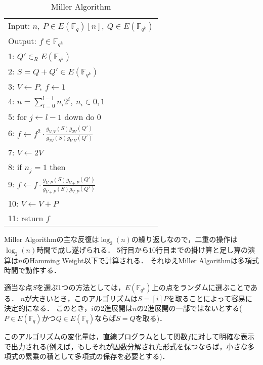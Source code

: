 \begin{table}[htbp]
 \begin{center}
  \begin{tabular}{|l|}
     \hline
     Input: $n, \ P \in E(\mathbb{F}_q)[n], \ Q \in E(\mathbb{F}_{q^k})$ \\
     Output: $f \in \mathbb{F}_{q^k}$  \\
     \hline
     1: \quad $Q' \in _R E(\mathbb{F}_{q^k})$\\
     2: \quad $S=Q+Q' \in E(\mathbb{F}_{q^k})$\\
     3: \quad $V \gets P, \ f \gets 1$\\
     4: \quad $n=\sum^{l-1}_{i=0} n_i 2^i, \ n_i \in {0,1}$\\
     5: \quad for $j \gets l-1$ down do 0\\
     6: \quad \quad $f \gets f^2 \cdot \frac{g_{V,V}(S)g_{2V}(Q')}{g_{2V}(S)g_{V,V}(Q')}$\\
     7: \quad \quad $V \gets 2V$\\
     8: \quad if $n_j = 1$ then\\
     9: \quad \quad $f \gets f \cdot \frac{g_{V,P}(S)g_{V+P}(Q')}{g_{V+P}(S)g_{V,P}(Q')}$\\
     10: \quad \quad $V \gets V+P$\\
     11: \quad return $f$\\
     \hline
   \end{tabular}
 \end{center}
 \caption{Miller Algorithm}
\end{table}
\par
Miller Algorithmの主な反復は$\log _2(n)$の繰り返しなので，二重の操作は$\log _2(n)$時間で成し遂げられる．
5行目から10行目までの掛け算と足し算の演算は$n$のHamming Weight以下で計算される．
それゆえMiller Algorithmは多項式時間で動作する．
\par
適当な点$S$を選ぶ1つの方法としては，$E(\mathbb{F}_{q^k})$上の点をランダムに選ぶことである．
$n$が大きいとき，このアルゴリズムは$S = [i]P$を取ることによって容易に決定的になる．
このとき，$i$の2進展開は$n$の2進展開の一部ではないとする($P \in E(\mathbb{F} _q)$かつ$Q \in E(\mathbb{F} _q)$ならば$S = Q$を取る)．
\par
このアルゴリズムの変化量は，直線プログラムとして関数$f$に対して明確な表示で出力される(例えば，もしそれが因数分解された形式を保つならば，小さな多項式の累乗の積として多項式の保存を必要とする)．\\

\par
